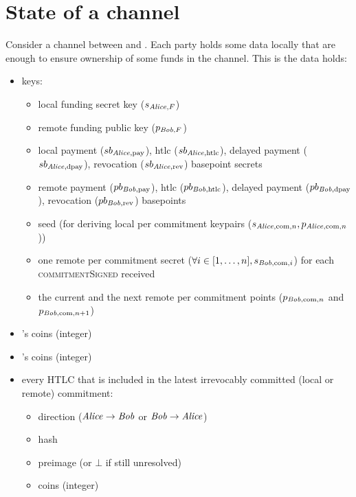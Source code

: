 \section{State of a channel} 
  Consider a channel between \alice{} and \bob. Each party holds some data
  locally that are enough to ensure ownership of some funds in the channel. This
  is the data \alice{} holds:

  \begin{itemize}
    \item keys:
    \begin{itemize}
      \item local funding secret key ($s_{\mathit{Alice}, F}$)
      \item remote funding public key ($p_{\mathit{Bob}, F}$)
      \item local payment ($sb_{\mathit{Alice}, \mathrm{pay}}$), htlc ($sb_{\mathit{Alice},
      \mathrm{htlc}}$), delayed payment ($sb_{\mathit{Alice}, \mathrm{dpay}}$),
      revocation ($sb_{\mathit{Alice}, \mathrm{rev}}$) basepoint secrets
      \item remote payment ($pb_{\mathit{Bob}, \mathrm{pay}}$), htlc ($pb_{\mathit{Bob},
      \mathrm{htlc}}$), delayed payment ($pb_{\mathit{Bob}, \mathrm{dpay}}$), revocation
      ($pb_{\mathit{Bob}, \mathrm{rev}}$) basepoints
      \item seed (for deriving local per commitment keypairs ($s_{\mathit{Alice},
      \mathrm{com}, n}, p_{\mathit{Alice}, \mathrm{com}, n}$))
      \item one remote per commitment secret ($\forall i \in [1, \dots, n],
      s_{\mathit{Bob}, \mathrm{com}, i}$) for each \textsc{commitmentSigned} received
      \item the current and the next remote per commitment points ($p_{\mathit{Bob},
      \mathrm{com}, n}$ and $p_{\mathit{Bob}, \mathrm{com}, n + 1}$)
    \end{itemize}
    \item \alice's coins (integer)
    \item \bob's coins (integer)
    \item every HTLC that is included in the latest irrevocably committed (local
    or remote) commitment:
      \begin{itemize}
        \item direction ($\mathit{Alice} \rightarrow \mathit{Bob}$ or $\mathit{Bob} \rightarrow \mathit{Alice}$)
        \item hash
        \item preimage (or $\bot$ if still unresolved)
        \item coins (integer)

\end{itemize}
\end{itemize}
